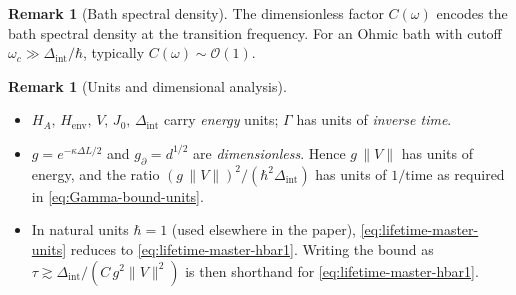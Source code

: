 \documentclass[11pt]{article}
\theoremstyle{plain}
\theoremstyle{definition}
\newtheorem{remark}[theorem]{Remark}
\begin{document}
\begin{remark}[Bath spectral density]
  The dimensionless factor $C(\omega)$ encodes the bath spectral density at the
  transition frequency. For an Ohmic bath with cutoff $\omega_c \gg \Delta_{\mathrm{int}}/\hbar$,
  typically $C(\omega) \sim \mathcal{O}(1)$.
\end{remark}

\begin{remark}[Units and dimensional analysis]
  \leavevmode
  \begin{itemize}[leftmargin=1.5em]
    \item $H_A,\,H_{\mathrm{env}},\,V,\,J_0,\,\Delta_{\mathrm{int}}$ carry \emph{energy} units; $\Gamma$ has units of \emph{inverse time}.
    \item $g=e^{-\kappa \Delta L/2}$ and $g_{\partial}=d^{1/2}$ are \emph{dimensionless}. Hence $g\,\|V\|$ has units of energy, and the ratio $(g\,\|V\|)^2/(\hbar^2\Delta_{\mathrm{int}})$ has units of $1/\text{time}$ as required in \eqref{eq:Gamma-bound-units}.
    \item In natural units $\hbar=1$ (used elsewhere in the paper), \eqref{eq:lifetime-master-units} reduces to \eqref{eq:lifetime-master-hbar1}. Writing the bound as $\tau \gtrsim \Delta_{\mathrm{int}}/(C\,g^2\|V\|^2)$ is then shorthand for \eqref{eq:lifetime-master-hbar1}.
  \end{itemize}
\end{remark}
\end{document}
